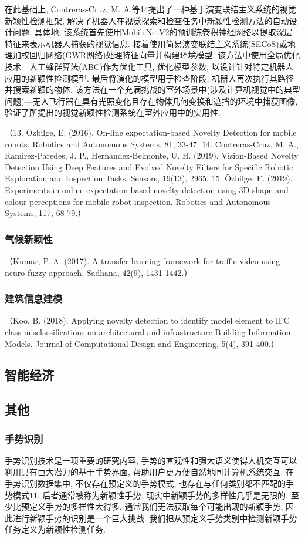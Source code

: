 \documentclass{Style/aas}
\begin{document}
\begin{multicols}{2}
  在此基础上, Contreras-Cruz, M. A.等14提出了一种基于演变联结主义系统的视觉新颖性检测框架, 解决了机器人在视觉探索和检查任务中新颖性检测方法的自动设计问题. 具体地, 该系统首先使用MobileNetV2的预训练卷积神经网络以提取深层特征来表示机器人捕获的视觉信息. 接着使用简易演变联结主义系统(SECoS)或地理加权回归网络(GWR网络)处理特征向量并构建环境模型.   该方法中使用全局优化技术—人工蜂群算法(ABC)作为优化工具, 优化模型参数, 以设计针对特定机器人应用的新颖性检测模型. 最后将演化的模型用于检查阶段, 机器人再次执行其路径并搜索新颖的物体. 该方法在一个充满挑战的室外场景中(涉及计算机视觉中的典型问题)—无人飞行器在具有光照变化且存在物体几何变换和遮挡的环境中捕获图像, 验证了所提出的视觉新颖性检测系统在室外应用中的实用性.

  （13.	Özbilge, E. (2016). On-line expectation-based Novelty Detection for mobile robots. Robotics and Autonomous Systems, 81, 33-47.
  14.	Contreras-Cruz, M. A., Ramirez-Paredes, J. P., Hernandez-Belmonte, U. H. (2019). Vision-Based Novelty Detection Using Deep Features and Evolved Novelty Filters for Specific Robotic Exploration and Inspection Tasks. Sensors, 19(13), 2965.
  15.	Özbilge, E. (2019). Experiments in online expectation-based novelty-detection using 3D shape and colour perceptions for mobile robot inspection. Robotics and Autonomous Systems, 117, 68-79.）

  \subsubsection{气候新颖性}
  （Kumar, P. A. (2017). A transfer learning framework for traffic video using neuro-fuzzy approach. Sādhanā, 42(9), 1431-1442.）

  \subsubsection{建筑信息建模}
  （Koo, B. (2018). Applying novelty detection to identify model element to IFC class misclassifications on architectural and infrastructure Building Information Models. Journal of Computational Design and Engineering, 5(4), 391-400.）

  \subsection{智能经济}
  \subsection{其他}
  \subsubsection{手势识别}
  手势识别技术是一项重要的研究内容, 手势的直观性和强大语义使得人机交互可以利用具有巨大潜力的基于手势界面, 帮助用户更方便自然地同计算机系统交互. 在手势识别数据集中, 不仅存在预定义的手势模式, 也存在与任何类别都不匹配的手势模式11, 后者通常被称为新颖性手势. 现实中新颖手势的多样性几乎是无限的, 至少比预定义手势的多样性大得多, 通常我们无法获取每个可能出现的新颖手势, 因此进行新颖手势的识别是一个巨大挑战. 我们把从预定义手势类别中检测新颖手势任务定义为新颖性检测任务.


\end{multicols}
\end{document}
